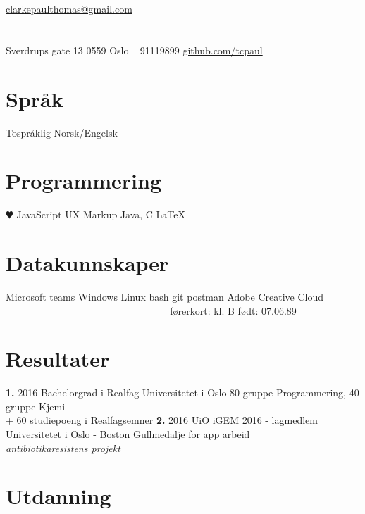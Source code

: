 \documentclass[]{friggeri-cv}
\begin{document}
       {\Letter \href{mailto:clarkepaulthomas@gmail.com}{ clarkepaulthomas@gmail.com}}


\begin{aside}
  \section{}{Sverdrups gate 13 } 
    0559 Oslo
    ~
    {91119899 } \Mobilefone 
    \href{https://github.com/tcpaul}{github.com/tcpaul } \faGithub
  \section{Språk}
    Tospråklig Norsk/Engelsk
  \section{Programmering}
    {\color{red} $\varheartsuit$} JavaScript
    UX Markup
    Java, C
    \LaTeX
  \section{Datakunnskaper}
    Microsoft teams
    Windows
    Linux
    bash
    git
    postman
    Adobe Creative Cloud
    ~
    ~
    ~
    ~
    ~
    ~
    ~
    ~
    ~
    ~
    ~
    ~
    ~
    ~
    ~
    ~
    ~
    ~
    ~
    ~
    ~
    ~
    ~
    ~
    førerkort: kl. B
    født: 07.06.89
\end{aside}

\section{Resultater}

\begin{entrylist}
  \entry
    {\textbf{1.} 2016}
    {Bachelorgrad i Realfag}
    {Universitetet i Oslo}
    {80 gruppe Programmering, 40 gruppe Kjemi\\ + 60 studiepoeng i Realfagsemner}
  \entry
    {\textbf{2.} 2016}
    {UiO iGEM 2016 - lagmedlem}
    {Universitetet i Oslo - Boston}
    {Gullmedalje for app arbeid \\ \emph{antibiotikaresistens projekt}}
\end{entrylist}

\section{Utdanning}
\end{document}
